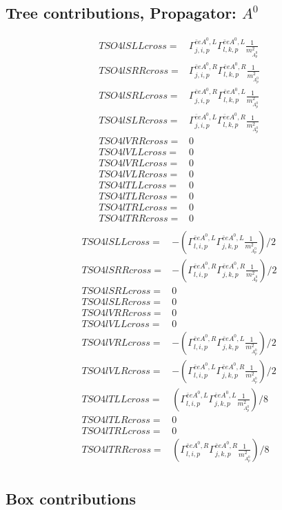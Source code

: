 \documentclass[A4,landscape]{article}
\begin{document}
\subsection{Tree contributions, Propagator: $A^0$} 

\begin{align} 
  TSO4lSLLcross= & \Gamma^{\bar{e}e A^0 ,L}_{j, i, p} \Gamma^{\bar{e}e A^0 ,L}_{l, k, p} \frac{1}{m^2_{A^0_{{p}}}} \\ 
  TSO4lSRRcross= & \Gamma^{\bar{e}e A^0 ,R}_{j, i, p} \Gamma^{\bar{e}e A^0 ,R}_{l, k, p} \frac{1}{m^2_{A^0_{{p}}}} \\ 
  TSO4lSRLcross= & \Gamma^{\bar{e}e A^0 ,R}_{j, i, p} \Gamma^{\bar{e}e A^0 ,L}_{l, k, p} \frac{1}{m^2_{A^0_{{p}}}} \\ 
  TSO4lSLRcross= & \Gamma^{\bar{e}e A^0 ,L}_{j, i, p} \Gamma^{\bar{e}e A^0 ,R}_{l, k, p} \frac{1}{m^2_{A^0_{{p}}}} \\ 
  TSO4lVRRcross= & 0 \\ 
  TSO4lVLLcross= & 0 \\ 
  TSO4lVRLcross= & 0 \\ 
  TSO4lVLRcross= & 0 \\ 
  TSO4lTLLcross= & 0 \\ 
  TSO4lTLRcross= & 0 \\ 
  TSO4lTRLcross= & 0 \\ 
  TSO4lTRRcross= & 0 \\ 
\end{align} 
\begin{align} 
  TSO4lSLLcross= & -(\Gamma^{\bar{e}e A^0 ,L}_{l, i, p} \Gamma^{\bar{e}e A^0 ,L}_{j, k, p} \frac{1}{m^2_{A^0_{{p}}}})/2 \\ 
  TSO4lSRRcross= & -(\Gamma^{\bar{e}e A^0 ,R}_{l, i, p} \Gamma^{\bar{e}e A^0 ,R}_{j, k, p} \frac{1}{m^2_{A^0_{{p}}}})/2 \\ 
  TSO4lSRLcross= & 0 \\ 
  TSO4lSLRcross= & 0 \\ 
  TSO4lVRRcross= & 0 \\ 
  TSO4lVLLcross= & 0 \\ 
  TSO4lVRLcross= & -(\Gamma^{\bar{e}e A^0 ,R}_{l, i, p} \Gamma^{\bar{e}e A^0 ,L}_{j, k, p} \frac{1}{m^2_{A^0_{{p}}}})/2 \\ 
  TSO4lVLRcross= & -(\Gamma^{\bar{e}e A^0 ,L}_{l, i, p} \Gamma^{\bar{e}e A^0 ,R}_{j, k, p} \frac{1}{m^2_{A^0_{{p}}}})/2 \\ 
  TSO4lTLLcross= & (\Gamma^{\bar{e}e A^0 ,L}_{l, i, p} \Gamma^{\bar{e}e A^0 ,L}_{j, k, p} \frac{1}{m^2_{A^0_{{p}}}})/8 \\ 
  TSO4lTLRcross= & 0 \\ 
  TSO4lTRLcross= & 0 \\ 
  TSO4lTRRcross= & (\Gamma^{\bar{e}e A^0 ,R}_{l, i, p} \Gamma^{\bar{e}e A^0 ,R}_{j, k, p} \frac{1}{m^2_{A^0_{{p}}}})/8 \\ 
\end{align} 
\subsection{Box contributions} 
\end{document}
